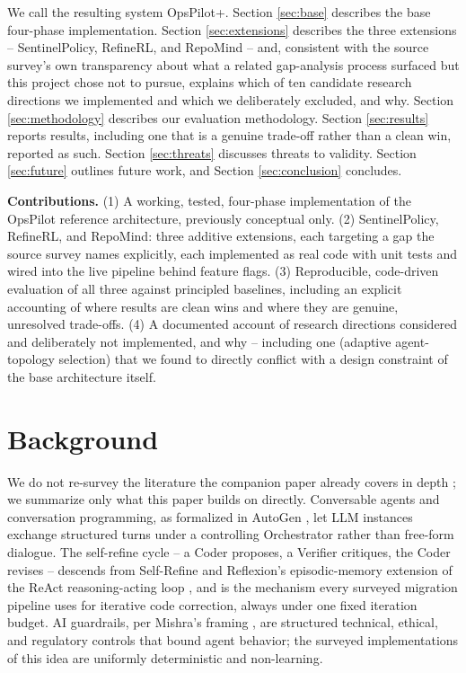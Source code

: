 \documentclass[conference]{IEEEtran}
\begin{document}
We call the resulting system OpsPilot+. Section \ref{sec:base} describes the
base four-phase implementation. Section \ref{sec:extensions} describes the
three extensions -- SentinelPolicy, RefineRL, and RepoMind -- and,
consistent with the source survey's own transparency about what a related
gap-analysis process surfaced but this project chose not to pursue, explains
which of ten candidate research directions we implemented and which we
deliberately excluded, and why. Section \ref{sec:methodology} describes our
evaluation methodology. Section \ref{sec:results} reports results, including
one that is a genuine trade-off rather than a clean win, reported as such.
Section \ref{sec:threats} discusses threats to validity. Section
\ref{sec:future} outlines future work, and Section \ref{sec:conclusion}
concludes.

\textbf{Contributions.} (1) A working, tested, four-phase implementation of
the OpsPilot reference architecture, previously conceptual only. (2)
SentinelPolicy, RefineRL, and RepoMind: three additive extensions, each
targeting a gap the source survey names explicitly, each implemented as real
code with unit tests and wired into the live pipeline behind feature flags.
(3) Reproducible, code-driven evaluation of all three against principled
baselines, including an explicit accounting of where results are clean wins
and where they are genuine, unresolved trade-offs. (4) A documented account
of research directions considered and deliberately not implemented, and why
-- including one (adaptive agent-topology selection) that we found to
directly conflict with a design constraint of the base architecture itself.

\section{Background}

We do not re-survey the literature the companion paper already covers in
depth \cite{survey}; we summarize only what this paper builds on directly.
Conversable agents and conversation programming, as formalized in AutoGen
\cite{autogen}, let LLM instances exchange structured turns under a
controlling Orchestrator rather than free-form dialogue. The self-refine
cycle -- a Coder proposes, a Verifier critiques, the Coder revises -- descends
from Self-Refine \cite{selfrefine} and Reflexion's episodic-memory extension
\cite{reflexion} of the ReAct reasoning-acting loop \cite{react}, and is the
mechanism every surveyed migration pipeline uses for iterative code
correction, always under one fixed iteration budget. AI guardrails, per
Mishra's framing \cite{guardrails}, are structured technical, ethical, and
regulatory controls that bound agent behavior; the surveyed implementations
of this idea are uniformly deterministic and non-learning.
\end{document}
